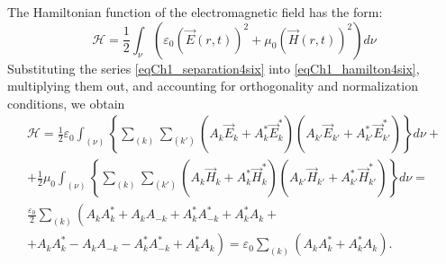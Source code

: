 The Hamiltonian function of the electromagnetic field has the form:
\begin{equation}
\mathcal{H} = \frac{1}{2}
\int_{\nu}\left( \varepsilon_0\left(\vec{E}\left(r,t\right)\right)^2 + \mu_0
\left(\vec{H}\left(r,t\right)\right)^2\right) d\nu
\label{eqCh1_hamilton4six}
\end{equation}
Substituting the series \eqref{eqCh1_separation4six} into \eqref{eqCh1_hamilton4six}, multiplying them out, and accounting for orthogonality and normalization conditions, we obtain
\begin{eqnarray}
\mathcal{H} = \frac{1}{2} \varepsilon_0
\int_{(\nu)}\left\{
\sum_{(k)}\sum_{(k')}
\left(A_k\vec{E}_k + A_k^{*}\vec{E}_k^{*}\right)
\left(A_{k'}\vec{E}_{k'} + A_{k'}^{*}\vec{E}_{k'}^{*}\right)
\right\}d \nu +
\nonumber \\
+ 
\frac{1}{2} \mu_0
\int_{(\nu)}\left\{
\sum_{(k)}\sum_{(k')}
\left(A_k\vec{H}_k + A_k^{*}\vec{H}_k^{*}\right)
\left(A_{k'}\vec{H}_{k'} + A_{k'}^{*}\vec{H}_{k'}^{*}\right)
\right\} d \nu = 
\nonumber \\
\frac{\varepsilon_0}{2} \sum_{(k)} 
\left(
A_k A_k^{*} + A_k A_{-k} + A_k^{*} A_{-k}^{*} + A_k^{*} A_k +
\right.
\nonumber \\
\left.
+ A_k A_k^{*} - A_k A_{-k} - A_k^{*} A_{-k}^{*} + A_k^{*} A_k
\right) = \varepsilon_0 \sum_{(k)} 
\left(A_k A_k^{*} + A_k^{*} A_k \right).
\label{eqCh1_separation4hamilton}
\end{eqnarray}